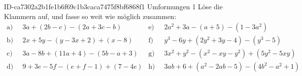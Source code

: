 \begin{exercise}
      {ID-ca7302a2b1fe1b6f69c1b3caca7475f8bf6868f1}
      {Umformungen 1}
  \newcommand{\gap}{\;\;}%
  \ifproblem\problem
    Löse die Klammern auf, und fasse so weit wie möglich zusammen:
    \begin{align*}
      \text{a)}\gap & 3a+(2b-c)-(2a+3c-b) &
      \text{e)}\gap & 2a^2+3a-(a+5)-(1-3a^2)
      \\
      \text{b)}\gap & 2x+5y-(y-3x+2)+(x-8) &
      \text{f)}\gap & y^3-6y+(2y^2+3y-4)-(y^3-5)
      \\
      \text{c)}\gap & 3a-8b+(11a+4)-(5b-a+3) &
      \text{g)}\gap & 3x^2+y^2-(x^2-xy-y^2)+(5y^2-5xy)
      \\
      \text{d)}\gap & 9+3e-5f-(e+f-1)+(7-4e) &
      \text{h)}\gap & 3ab+6+(a^2-2ab-5)-(4b^2-a^2+1)
    \end{align*}
  \fi
  \ifoutcome\outcome
    \newcommand{\toprow}[1]
    {%
      \makebox[20em][l]
      {%
        \ensuremath
        {%
          \displaystyle
          \phantom{\,=\:\,}%
          #1%
        }%
      }%
    }%
    \newcommand{\solutionA}
    {%
      \begin{equation*}
        \begin{split}
          \text{a)} &\toprow{3a+(2b-c)-(2a+3c-b)} \\
                    &=       3a+2b-c-2a-3c+b      \\
                    &=       a+3b-4c
        \end{split}
      \end{equation*}
    }%
    \newcommand{\solutionB}
    {%
      \begin{equation*}
        \begin{split}
          \text{b)} &\toprow{2x+5y-(y-3x+2)+(x-8)} \\
                    &=       2x+5y-y+3x-2+x-8      \\
                    &=       6x+4y-10
        \end{split}
      \end{equation*}
    }%
    \newcommand{\solutionC}
    {%
      \begin{equation*}
        \begin{split}
          \text{c)} &\toprow{3a-8b+(11a+4)-(5b-a+3)} \\
                    &=     3a-8b+11a+4-5b+a-3        \\

\end{split}
\end{equation*}}
\end{exercise}
